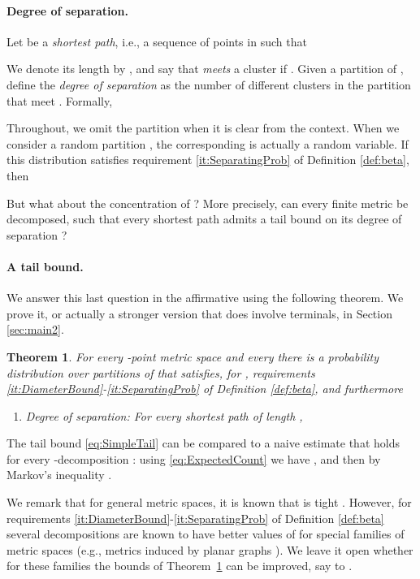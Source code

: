 \documentclass[twoside,leqno,twocolumn]{article}
\newtheorem{theorem}{Theorem}[section]
\def\compactify{\itemsep=0pt \topsep=0pt \partopsep=0pt \parsep=0pt}
\begin{document}
\paragraph{Degree of separation.}
Let  be a {\em shortest path},
i.e., a sequence of points in  such that

We denote its length by ,
and say that  {\em meets} a cluster  
if . 
Given a partition  of , 
define the \emph{degree of separation}  as
the number of different clusters in the partition  that meet . 
Formally,


Throughout, we omit the partition  when it is clear from the context.
When we consider a random partition , 
the corresponding  is actually a random variable.
If this distribution  satisfies 
requirement \ref{it:SeparatingProb} of Definition \ref{def:beta}, then 

But what about the concentration of ?
More precisely, can every finite metric be decomposed, such that 
every shortest path  admits a tail bound on its degree of separation ?

\paragraph{A tail bound.}
We answer this last question in the affirmative using the following theorem.
We prove it, or actually a stronger version that does involve terminals,
in Section \ref{sec:main2}.


\begin{theorem}\label{thm:main2}
For every -point metric space  and every  
there is a probability distribution  over partitions of 
that satisfies, for ,
requirements \ref{it:DiameterBound}-\ref{it:SeparatingProb} 
of Definition \ref{def:beta}, and furthermore
\begin{enumerate} \compactify
\renewcommand{\theenumi}{\emph{(\alph{enumi})}}
\addtocounter{enumi}{2}
\item \label{it:DegreeSeparation}
Degree of separation: For every shortest path  of length , 

\end{enumerate}
\end{theorem}
The tail bound \eqref{eq:SimpleTail} can be compared to a naive estimate 
that holds for every -decomposition :
using \eqref{eq:ExpectedCount} we have ,
and then by Markov's inequality .

We remark that for general metric spaces, it is known that  is tight \cite{Bartal96}. However, for requirements \ref{it:DiameterBound}-\ref{it:SeparatingProb} of Definition \ref{def:beta} several decompositions are known to have better values of  
for special families of metric spaces 
(e.g., metrics induced by planar graphs \cite{KPR93}). 
We leave it open whether for these families
the bounds of Theorem~\ref{thm:main2} can be improved, say to .
\end{document}
